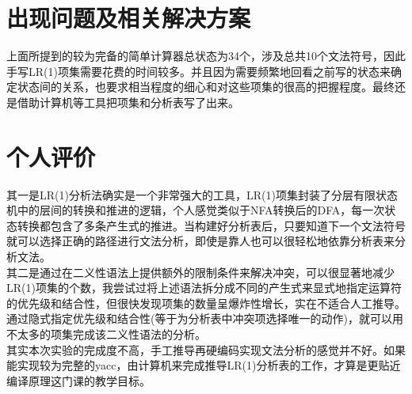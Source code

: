\documentclass[a4paper]{ctexart} %
\begin{document}
	\section{出现问题及相关解决方案}
	上面所提到的较为完备的简单计算器总状态为34个，涉及总共10个文法符号，因此手写LR(1)项集需要花费的时间较多。并且因为需要频繁地回看之前写的状态来确定状态间的关系，也要求相当程度的细心和对这些项集的很高的把握程度。最终还是借助计算机等工具把项集和分析表写了出来。

	\section{个人评价}
	其一是LR(1)分析法确实是一个非常强大的工具，LR(1)项集封装了分层有限状态机中的层间的转换和推进的逻辑，个人感觉类似于NFA转换后的DFA，每一次状态转换都包含了多条产生式的推进。当构建好分析表后，只要知道下一个文法符号就可以选择正确的路径进行文法分析，即使是靠人也可以很轻松地依靠分析表来分析文法。\\
	其二是通过在二义性语法上提供额外的限制条件来解决冲突，可以很显著地减少LR(1)项集的个数，我尝试过将上述语法拆分成不同的产生式来显式地指定运算符的优先级和结合性，但很快发现项集的数量呈爆炸性增长，实在不适合人工推导。通过隐式指定优先级和结合性(等于为分析表中冲突项选择唯一的动作)，就可以用不太多的项集完成该二义性语法的分析。\\
	其实本次实验的完成度不高，手工推导再硬编码实现文法分析的感觉并不好。如果能实现较为完整的yacc，由计算机来完成推导LR(1)分析表的工作，才算是更贴近编译原理这门课的教学目标。
	
\end{document}
